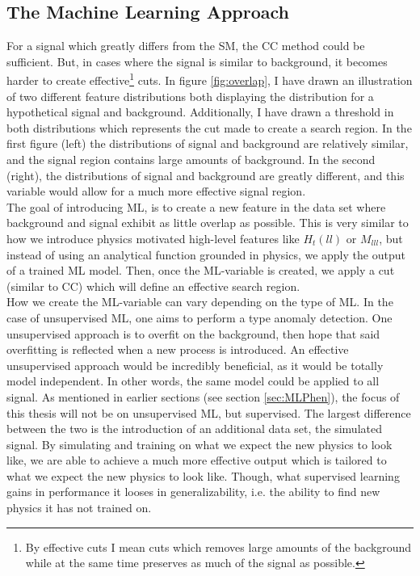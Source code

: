 \subsection{The Machine Learning Approach}
For a signal which greatly differs from the \ac{SM}, the \ac{CC} method could be sufficient. But, in 
cases where the signal is similar to background, it becomes harder to create effective\footnote{By effective
cuts I mean cuts which removes large amounts of the background while at the same time preserves as much of 
the signal as possible.} cuts. In figure \ref{fig:overlap}, I have drawn an illustration of two different feature distributions both 
displaying the distribution for a hypothetical signal and background. Additionally, I have drawn a 
threshold in both distributions which represents the cut made to create a search region. In the first 
figure (left) the distributions of signal and background are relatively similar, and the signal region 
contains large amounts of background. In the second (right), the distributions of signal and background 
are greatly different, and this variable would allow for a much more effective signal region. 
\\
The goal of introducing \ac{ML}, is to create a new feature in the data set where background and signal
exhibit as little overlap as possible. This is very similar to how we introduce physics motivated high-level
features like $H_t(ll)$ or $M_{lll}$, but instead of using an analytical function grounded in physics, 
we apply the output of a trained \ac{ML} model. Then, once the \ac{ML}-variable is created, 
we apply a cut (similar to \ac{CC}) which will define an effective search region. 
\\
How we create the \ac{ML}-variable can vary depending on the type of \ac{ML}. In the case of unsupervised 
\ac{ML}, one aims to perform a type anomaly detection. One unsupervised approach is to overfit on the background,
then hope that said overfitting is reflected when a new process is introduced. An effective unsupervised approach
would be incredibly beneficial, as it would be totally model independent. In other words, the same model could be applied 
to all signal. As mentioned in earlier sections (see section \ref{sec:MLPhen}), the focus of this thesis will not be on 
unsupervised \ac{ML}, but supervised. The largest difference between the two is the introduction of an additional data set,
the simulated signal. By simulating and training on what we expect the new physics to look like, we are able to achieve a much more 
effective output which is tailored to what we expect the new physics to look like. Though, what supervised learning gains in performance
it looses in generalizability, i.e. the ability to find new physics it has not trained on.